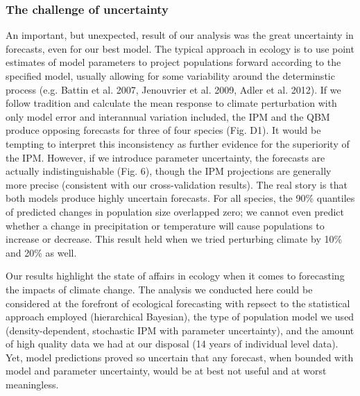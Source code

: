\documentclass[12pt,]{article}
\begin{document}
\subsubsection{The challenge of
uncertainty}\label{the-challenge-of-uncertainty}

An important, but unexpected, result of our analysis was the great
uncertainty in forecasts, even for our best model. The typical approach
in ecology is to use point estimates of model parameters to project
populations forward according to the specified model, usually allowing
for some variability around the determinstic process (e.g. Battin et al.
2007, Jenouvrier et al. 2009, Adler et al. 2012). If we follow tradition
and calculate the mean response to climate perturbation with only model
error and interannual variation included, the IPM and the QBM produce
opposing forecasts for three of four species (Fig. D1). It would be
tempting to interpret this inconsistency as further evidence for the
superiority of the IPM. However, if we introduce parameter uncertainty,
the forecasts are actually indistinguishable (Fig. 6), though the IPM
projections are generally more precise (consistent with our
cross-validation results). The real story is that both models produce
highly uncertain forecasts. For all species, the 90\% quantiles of
predicted changes in population size overlapped zero; we cannot even
predict whether a change in precipitation or temperature will cause
populations to increase or decrease. This result held when we tried
perturbing climate by 10\% and 20\% as well.

Our results highlight the state of affairs in ecology when it comes to
forecasting the impacts of climate change. The analysis we conducted
here could be considered at the forefront of ecological forecasting with
repsect to the statistical approach employed (hierarchical Bayesian),
the type of population model we used (density-dependent, stochastic IPM
with parameter uncertainty), and the amount of high quality data we had
at our disposal (14 years of individual level data). Yet, model
predictions proved so uncertain that any forecast, when bounded with
model and parameter uncertainty, would be at best not useful and at
worst meaningless.
\end{document}
